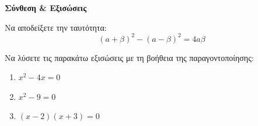 \documentclass[11pt,a4paper,modern,B]{FFExam}
\begin{document}
\begin{thema}
\item \textbf{Σύνθεση \& Εξισώσεις}
\begin{erwthma}
    \item Να αποδείξετε την ταυτότητα: 
    \[ (a+\beta)^2 - (a-\beta)^2 = 4a\beta \]
    \item Να λύσετε τις παρακάτω εξισώσεις με τη βοήθεια της παραγοντοποίησης: 
    \begin{enumerate}[label=\alph*.]
        \item $x^2 - 4x = 0$
        \item $x^2 - 9 = 0$
        \item $(x-2)(x+3) = 0$
    \end{enumerate}
\end{erwthma}
\end{thema}

\kaliepityxia
\end{document}
